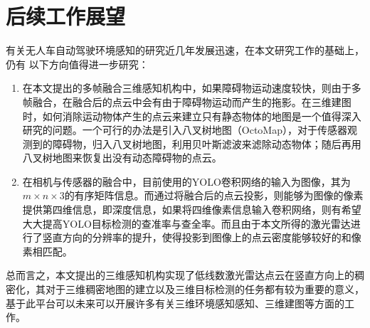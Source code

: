 \section{后续工作展望}
有关无人车自动驾驶环境感知的研究近几年发展迅速，在本文研究工作的基础上，仍有
以下方向值得进一步研究：
\begin{enumerate}
    \item 在本文提出的多帧融合三维感知机构中，如果障碍物运动速度较快，则由于多帧融合，在融合后的点云中会有由于障碍物运动而产生的拖影。在三维建图时，如何消除运动物体产生的点云来建立只有静态物体的地图是一个值得深入研究的问题。一个可行的办法是引入八叉树地图（OctoMap），对于传感器观测到的障碍物，归入八叉树地图，利用贝叶斯滤波来滤除动态物体；随后再用八叉树地图来恢复出没有动态障碍物的点云。
    \item 在相机与传感器的融合中，目前使用的YOLO卷积网络的输入为图像，其为$m\times n\times 3$的有序矩阵信息。而通过将融合后的点云投影，则能够为图像的像素提供第四维信息，即深度信息，如果将四维像素信息输入卷积网络，则有希望大大提高YOLO目标检测的查准率与查全率。而且由于本文所得的激光雷达进行了竖直方向的分辨率的提升，使得投影到图像上的点云密度能够较好的和像素相匹配。
\end{enumerate}

总而言之，本文提出的三维感知机构实现了低线数激光雷达点云在竖直方向上的稠密化，其对于三维稠密地图的建立以及三维目标检测的任务都有较为重要的意义，基于此平台可以未来可以开展许多有关三维环境感知感知、三维建图等方面的工作。